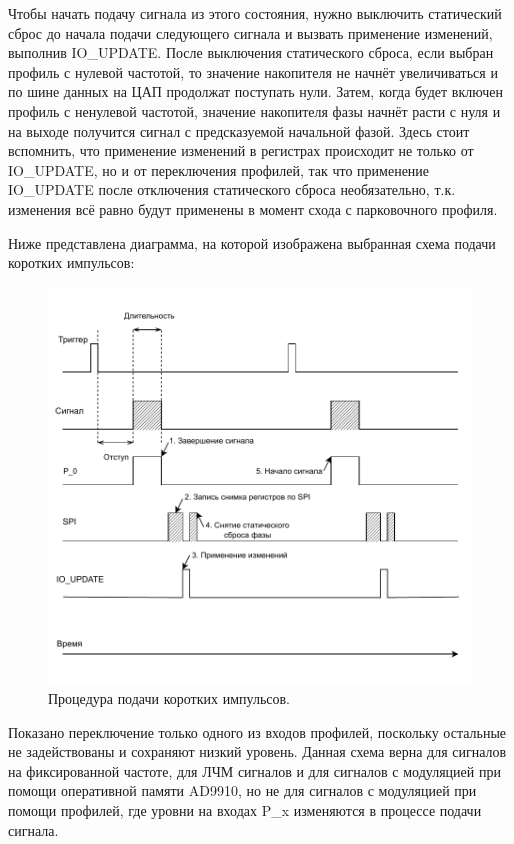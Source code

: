 \documentclass[rusmathsym, eqnumwithinsec, amspack, hyperref]{bomgost}
\begin{document}
Чтобы начать подачу сигнала из этого состояния, нужно выключить статический сброс до начала подачи следующего сигнала и вызвать применение изменений, выполнив IO\_UPDATE. После выключения статического сброса, если выбран профиль с нулевой частотой, то значение накопителя не начнёт увеличиваться и по шине данных на ЦАП продолжат поступать нули. Затем, когда будет включен профиль с ненулевой частотой, значение накопителя фазы начнёт расти с нуля и на выходе получится сигнал с предсказуемой начальной фазой. Здесь стоит вспомнить, что применение изменений в регистрах происходит не только от IO\_UPDATE, но и от переключения профилей, так что применение IO\_UPDATE после отключения статического сброса необязательно, т.к. изменения всё равно будут применены в момент схода с парковочного профиля.

Ниже представлена диаграмма, на которой изображена выбранная схема подачи коротких импульсов:

%
%
\begin{gostfigure}
\begin{figure}[H]
\centering
\includegraphics{data/detailed_timing_diagram.drawio.pdf}
\caption{Процедура подачи коротких импульсов.}
\label{fig:detailed_timing_diagram}
\end{figure}
\end{gostfigure}

Показано переключение только одного из входов профилей, поскольку остальные не задействованы и сохраняют низкий уровень. Данная схема верна для сигналов на фиксированной частоте, для ЛЧМ сигналов и для сигналов с модуляцией при помощи оперативной памяти AD9910, но не для сигналов с модуляцией при помощи профилей, где уровни на входах P\_x изменяются в процессе подачи сигнала.
\end{document}
